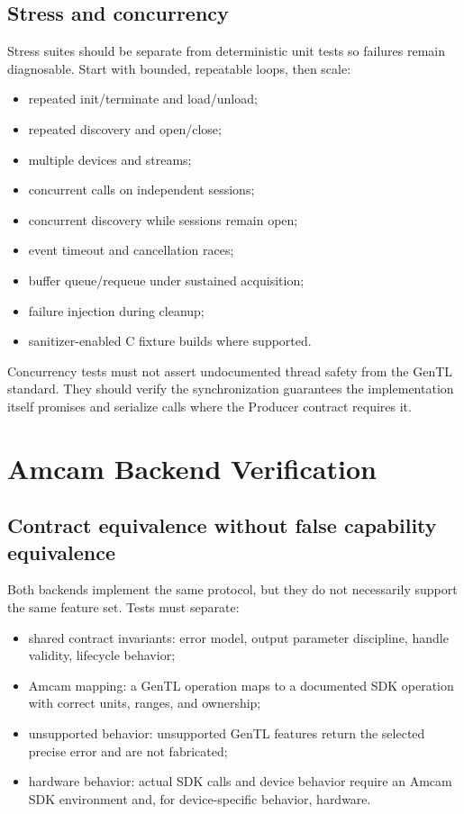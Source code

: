 \documentclass[11pt,a4paper]{report}
\begin{document}
\section{Stress and concurrency}
Stress suites should be separate from deterministic unit tests so failures remain diagnosable. Start with bounded, repeatable loops, then scale:
\begin{itemize}
  \item repeated init/terminate and load/unload;
  \item repeated discovery and open/close;
  \item multiple devices and streams;
  \item concurrent calls on independent sessions;
  \item concurrent discovery while sessions remain open;
  \item event timeout and cancellation races;
  \item buffer queue/requeue under sustained acquisition;
  \item failure injection during cleanup;
  \item sanitizer-enabled C fixture builds where supported.
\end{itemize}
Concurrency tests must not assert undocumented thread safety from the GenTL standard. They should verify the synchronization guarantees the implementation itself promises and serialize calls where the Producer contract requires it.

\chapter{Amcam Backend Verification}

\section{Contract equivalence without false capability equivalence}
Both backends implement the same protocol, but they do not necessarily support the same feature set. Tests must separate:
\begin{itemize}
  \item shared contract invariants: error model, output parameter discipline, handle validity, lifecycle behavior;
  \item Amcam mapping: a GenTL operation maps to a documented SDK operation with correct units, ranges, and ownership;
  \item unsupported behavior: unsupported GenTL features return the selected precise error and are not fabricated;
  \item hardware behavior: actual SDK calls and device behavior require an Amcam SDK environment and, for device-specific behavior, hardware.
\end{itemize}
\end{document}
